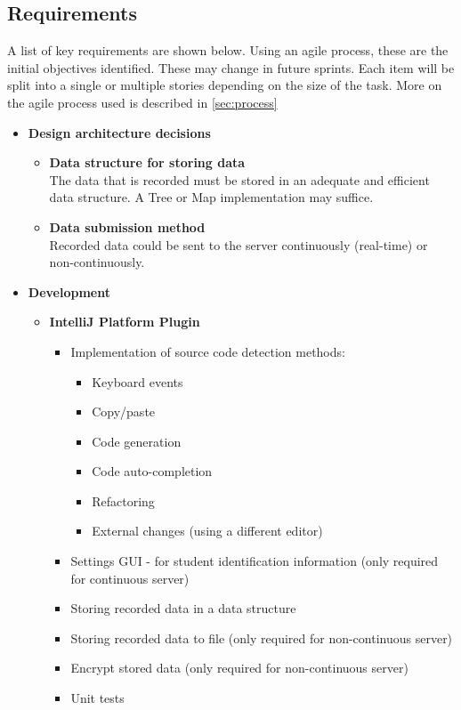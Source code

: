 \subsection{Requirements}
A list of key requirements are shown below. Using an agile process, these are the initial objectives identified. These may change in future sprints. Each item will be split into a single or multiple stories depending on the size of the task. More on the agile process used is described in \autoref{sec:process}

\begin{itemize}
  \item \textbf{Design architecture decisions}
  \begin{itemize}
    \item \textbf{Data structure for storing data}\\The data that is recorded must be stored in an adequate and efficient data structure. A Tree or Map implementation may suffice.
    \item \textbf{Data submission method}\\Recorded data could be sent to the server continuously (real-time) or non-continuously.
  \end{itemize}

  \item \textbf{Development}
  \begin{itemize}
    \item \textbf{IntelliJ Platform Plugin}
    \begin{itemize}
      \item Implementation of source code detection methods:
      \begin{itemize}
        \item Keyboard events
        \item Copy/paste
        \item Code generation
        \item Code auto-completion
        \item Refactoring
        \item External changes (using a different editor)
      \end{itemize}
      \item Settings GUI - for student identification information (only required for continuous server)
      \item Storing recorded data in a data structure 
      \item Storing recorded data to file (only required for non-continuous server)
      \item Encrypt stored data (only required for non-continuous server)
      \item Unit tests
    \end{itemize}


\end{itemize}
\end{itemize}
